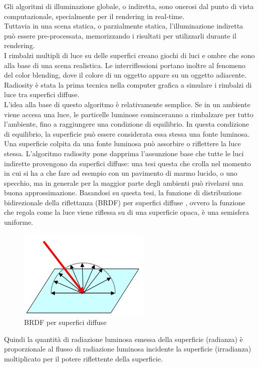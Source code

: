 Gli algoritmi di illuminazione globale, o indiretta, sono onerosi dal punto di vista computazionale, specialmente per il rendering in real-time.
\\
Tuttavia in una scena statica, o parzialmente statica, l’illuminazione indiretta può essere pre-processata, memorizzando i risultati per utilizzarli durante il rendering.
\\
I rimbalzi multipli di luce su delle superfici creano giochi di luci e ombre che sono alla base di una scena realistica. Le interriflessioni portano inoltre al fenomeno del color blending, dove il colore di un oggetto appare su un oggetto adiacente. 
Radiosity è stata la prima tecnica nella computer grafica a simulare i rimbalzi di luce tra superfici diffuse. \cite{light5,light2}
\\
L’idea alla base di questo algoritmo è relativamente semplice. Se in un ambiente viene accesa una luce, le particelle luminose cominceranno a rimbalzare per tutto l’ambiente, fino a raggiungere una condizione di equilibrio. In questa condizione di equilibrio, la superficie può essere considerata essa stessa una fonte luminosa.
\\
Una superficie colpita da una fonte luminosa può assorbire o riflettere la luce stessa. L’algoritmo radiosity pone dapprima l’assunzione base che tutte le luci indirette provengono da superfici diffuse: una tesi questa che crolla nel momento in cui si ha a che fare ad esempio con un pavimento di marmo lucido, o uno specchio, ma in generale per la maggior parte degli ambienti può rivelarsi una buona approssimazione. Basandosi su questa tesi, la funzione di distribuzione bidirezionale della riflettanza (BRDF) per superfici diffuse \cite{brdf}, ovvero la funzione che regola come la luce viene riflessa su di una superficie opaca, è una semisfera uniforme.
\begin{figure}[htb]
 \centering
 \includegraphics[width=0.4\linewidth]{images/chapter_stato_arte/stato_attuale_brdf_semistefa.png}\hfill
 \caption[BRDF superfici diffuse]{BRDF per superfici diffuse}
 \label{fig:stato_attuale_brdf_semistefa}
\end{figure}
Quindi la quantità di radiazione luminosa emessa della superficie (radianza) è proporzionale al flusso di radiazione luminosa incidente la superficie (irradianza) moltiplicato per il potere riflettente della superficie. 
